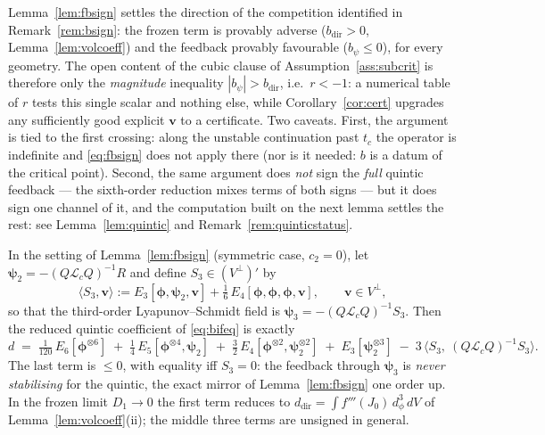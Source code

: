 \begin{remark}
    \label{rem:fbstatus}
    Lemma~\ref{lem:fbsign} settles the direction of the competition identified in Remark~\ref{rem:bsign}: the frozen
    term is provably adverse ($b_{\mathrm{dir}}>0$, Lemma~\ref{lem:volcoeff}) and the feedback provably favourable
    ($b_\psi\le0$), for every geometry. The open content of the cubic clause of Assumption~\ref{ass:subcrit} is
    therefore only the \emph{magnitude} inequality $|b_\psi|>b_{\mathrm{dir}}$, i.e.\ $r<-1$: a numerical table of $r$
    tests this single scalar and nothing else, while Corollary~\ref{cor:cert} upgrades any sufficiently good explicit
    $\bm{v}$ to a certificate. Two caveats. First, the argument is tied to the first crossing: along the unstable
    continuation past $t_c$ the operator is indefinite and \eqref{eq:fbsign} does not apply there (nor is it needed:
    $b$ is a datum of the critical point). Second, the same argument does \emph{not} sign the \emph{full} quintic
    feedback --- the sixth-order reduction mixes terms of both signs --- but it does sign one channel of it, and the
    computation built on the next lemma settles the rest: see Lemma~\ref{lem:quintic} and
    Remark~\ref{rem:quinticstatus}.
\end{remark}

\begin{lemma}
    \label{lem:quintic}
    In the setting of Lemma~\ref{lem:fbsign} (symmetric case, $c_2=0$), let $\bm\psi_2=-(Q\mathcal{L}_cQ)^{-1}R$ and
    define $S_3\in(V^\perp)'$ by
    \begin{equation}
        \label{eq:S3def}
        \langle S_3,\bm v\rangle := E_3[\bm\phi,\bm\psi_2,\bm v] + \tfrac16\,E_4[\bm\phi,\bm\phi,\bm\phi,\bm v],
        \qquad \bm v\in V^\perp ,
    \end{equation}
    so that the third-order Lyapunov--Schmidt field is $\bm\psi_3=-(Q\mathcal{L}_cQ)^{-1}S_3$. Then the reduced
    quintic coefficient of \eqref{eq:bifeq} is exactly
    \begin{equation}
        \label{eq:dformula}
        d \;=\; \tfrac1{120}\,E_6[\bm\phi^{\otimes6}]
        \;+\; \tfrac14\,E_5[\bm\phi^{\otimes4},\bm\psi_2]
        \;+\; \tfrac32\,E_4[\bm\phi^{\otimes2},\bm\psi_2^{\otimes2}]
        \;+\; E_3[\bm\psi_2^{\otimes3}]
        \;-\; 3\,\big\langle S_3,\ (Q\mathcal{L}_cQ)^{-1}S_3\big\rangle .
    \end{equation}
    The last term is $\le0$, with equality iff $S_3=0$: the feedback through $\bm\psi_3$ is \emph{never stabilising}
    for the quintic, the exact mirror of Lemma~\ref{lem:fbsign} one order up. In the frozen limit
    $D_1\to0$ the first term reduces to $d_{\mathrm{dir}}=\int f'''(J_0)\,d_\phi^3\,dV$ of
    Lemma~\ref{lem:volcoeff}(ii); the middle three terms are unsigned in general.
\end{lemma}

